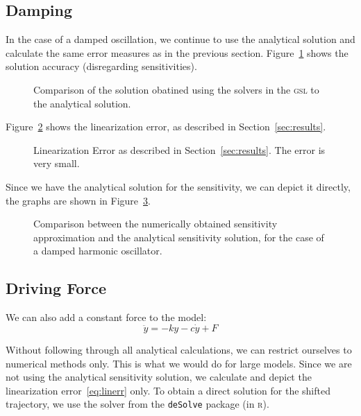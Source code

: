 \documentclass[utf8,english,DIV=12]{scrartcl}
\begin{document}
\subsection{Damping}
\label{sec:damping}

In the case of a damped oscillation, we continue to use the analytical
solution and calculate the same error measures as in the previous
section. Figure~\ref{fig:dampedGSLvsASol} shows the solution accuracy
(disregarding sensitivities).
\begin{figure}\sffamily\firalining
  \centering
  
  \caption{Comparison of the solution obatined using the solvers in
    the \textsc{gsl} to the analytical
    solution.  \label{fig:dampedGSLvsASol}}
\end{figure}
Figure~\ref{fig:dampedlinerr} shows the linearization error, as
described in Section~\ref{sec:results}.
\begin{figure}\sffamily\firalining
  \centering
  
  \caption{Linearization Error as described in
    Section~\ref{sec:results}. The error is very small.  \label{fig:dampedlinerr}}
\end{figure}
Since we have the analytical solution for the sensitivity, we can
depict it directly, the graphs are shown in
Figure~\ref{fig:dampedGSLvsASolSensitivity}.
\begin{figure}\sffamily\firalining
  \centering
  
  \caption{Comparison between the numerically obtained sensitivity
    approximation and the analytical sensitivity solution, for the
    case of a damped harmonic
    oscillator.  \label{fig:dampedGSLvsASolSensitivity}}
\end{figure}

\subsection{Driving Force}
\label{sec:driven}

We can also add a constant force to the model:
\begin{equation}
  \label{eq:F}
  \ddot y = -ky - c\dot y + F
\end{equation}

Without following through all analytical calculations, we can restrict
ourselves to numerical methods only. This is what we would do for
large models. Since we are not using the analytical sensitivity
solution, we calculate and depict the linearization
error~\eqref{eq:linerr} only. To obtain a direct solution for the shifted trajectory, we use the solver from the \texttt{deSolve} package (in \textsc{r}).
\end{document}
